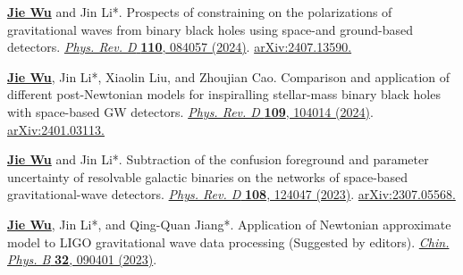 \begin{cvpublications}
\begin{pubitems}
\item {\textbf{\underline{Jie Wu}} and Jin Li*. Prospects of constraining on the polarizations of gravitational waves from binary black holes using space-and ground-based detectors. \href{https://journals.aps.org/prd/abstract/10.1103/PhysRevD.110.084057}{\textit{Phys. Rev. D} \textbf{110}, 084057 (2024)}. \href{https://arxiv.org/abs/2407.13590}{arXiv:2407.13590.}}

\item \textbf{\underline{Jie Wu}}, Jin Li*, Xiaolin Liu, and Zhoujian Cao. Comparison and application of different post-Newtonian models for inspiralling stellar-mass binary black holes with space-based GW detectors. \href{https://journals.aps.org/prd/abstract/10.1103/PhysRevD.109.104014}{\textit{Phys. Rev. D} \textbf{109}, 104014 (2024)}. \href{https://arxiv.org/abs/2401.03113}{arXiv:2401.03113.}

\item \textbf{\underline{Jie Wu}} and Jin Li*. Subtraction of the confusion foreground and parameter uncertainty of resolvable galactic binaries on the networks of space-based gravitational-wave detectors. \href{https://journals.aps.org/prd/abstract/10.1103/PhysRevD.108.124047}{\textit{Phys. Rev. D} \textbf{108}, 124047 (2023)}. \href{https://arxiv.org/abs/2307.05568}{arXiv:2307.05568.}

\item \textbf{\underline{Jie Wu}}, Jin Li*, and Qing-Quan Jiang*. Application of Newtonian approximate model to LIGO gravitational wave data processing (Suggested by editors). \href{https://cpb.iphy.ac.cn/EN/10.1088/1674-1056/acd8a3}{\textit{Chin. Phys. B} \textbf{32}, 090401 (2023)}.
\end{pubitems}
\end{cvpublications}
